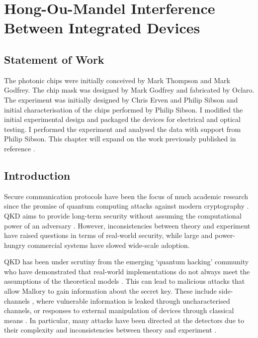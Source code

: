 %
\graphicspath{{./chapters/chapter03/fig03/}}

\let\textcircled=\pgftextcircled
\chapter[HOM Interference Between Integrated Devices]{Hong-Ou-Mandel Interference Between Integrated Devices}
\label{chap:hom}

\section*{Statement of Work}

The photonic chips were initially conceived by Mark Thompson and Mark Godfrey. The chip mask was designed by Mark Godfrey and fabricated by Oclaro. The experiment was initially designed by Chris Erven and Philip Sibson and initial characterisation of the chips performed by Philip Sibson. I modified the initial experimental design and packaged the devices for electrical and optical testing. I performed the experiment and analysed the data with support from Philip Sibson. This chapter will expand on the work previously published in reference \cite{semenenko2019}.

\section{Introduction}

Secure communication protocols have been the focus of much academic research since the promise of quantum computing attacks against modern cryptography \cite{shor1994}. \Ac{QKD} aims to provide long-term security without assuming the computational power of an adversary \cite{BB84, E91}. However, inconsistencies between theory and experiment have raised questions in terms of real-world security, while large and power-hungry commercial systems have slowed wide-scale adoption.

\Ac{QKD} has been under scrutiny from the emerging `quantum hacking' community who have demonstrated that real-world implementations do not always meet the assumptions of the theoretical models \cite{mdi-qkd}. This can lead to malicious attacks that allow Mallory to gain information about the secret key. These include side-channels \cite{Lamas-Linares2007}, where vulnerable information is leaked through uncharacterised channels, or responses to external manipulation of devices through classical means \cite{Gisin2006}. In particular, many attacks have been directed at the detectors due to their complexity and inconsistencies between theory and experiment \cite{Lydersen2010b,Zhao2008, Makarov2006}.

